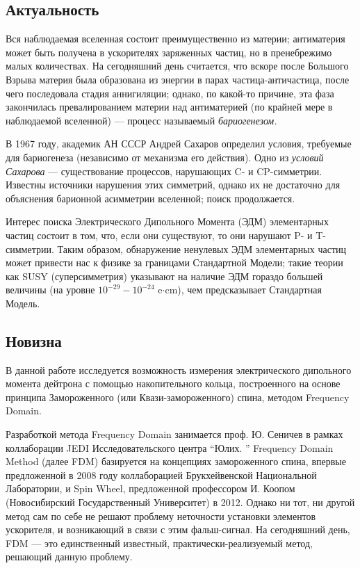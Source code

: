 \documentclass{report}
\begin{document}
\subsection{Актуальность}

Вся наблюдаемая вселенная состоит преимущественно из материи; антиматерия может быть получена в ускорителях заряженных частиц, но в пренебрежимо малых количествах. На сегодняшний день считается, что вскоре после Большого Взрыва материя была образована из энергии в парах частица-античастица, после чего последовала стадия аннигиляции; однако, по какой-то причине, эта фаза закончилась превалированием материи над антиматерией (по крайней мере в наблюдаемой вселенной) --- процесс называемый \emph{бариогенезом.}

В 1967 году, академик АН СССР Андрей Сахаров определил условия, требуемые для бариогенеза (независимо от механизма его действия). Одно из \emph{условий Сахарова} --- существование процессов, нарушающих C- и CP-симметрии. Известны источники нарушения этих симметрий, однако их не достаточно для объяснения барионной асимметрии вселенной; поиск продолжается.

Интерес поиска Электрического Дипольного Момента (ЭДМ) элементарных частиц состоит в том, что, если они существуют, то они нарушают P- и T-симметрии. Таким образом, обнаружение ненулевых ЭДМ элементарных частиц может привести нас к физике за границами Стандартной Модели; такие теории как SUSY (суперсимметрия) указывают на наличие ЭДМ гораздо большей величины (на уровне $10^{-29} - 10^{-24}$ e$\cdot$cm), чем предсказывает Стандартная Модель.

\subsection{Новизна}

В данной работе исследуется возможность измерения электрического
дипольного момента дейтрона с помощью накопительного кольца,
построенного на основе принципа Замороженного (или
Квази-замороженного) спина, методом Frequency Domain.

Разработкой метода Frequency Domain занимается проф. Ю. Сеничев в
рамках коллаборации JEDI Исследовательского центра ``Юлих. ''
Frequency Domain Method (далее FDM) базируется на концепциях замороженного спина,
впервые предложенной в 2008 году коллаборацией Брукхейвенской
Национальной Лаборатории, и Spin Wheel, предложенной профессором И. Коопом
(Новосибирский Государственный Университет) в 2012. Однако ни тот, ни другой
метод сам по себе не решают проблему неточности установки элементов
ускорителя, и возникающий в связи с этим фальш-сигнал.  На сегодняшний
день, FDM --- это единственный известный,
практически-реализуемый метод, решающий данную проблему.
\end{document}
